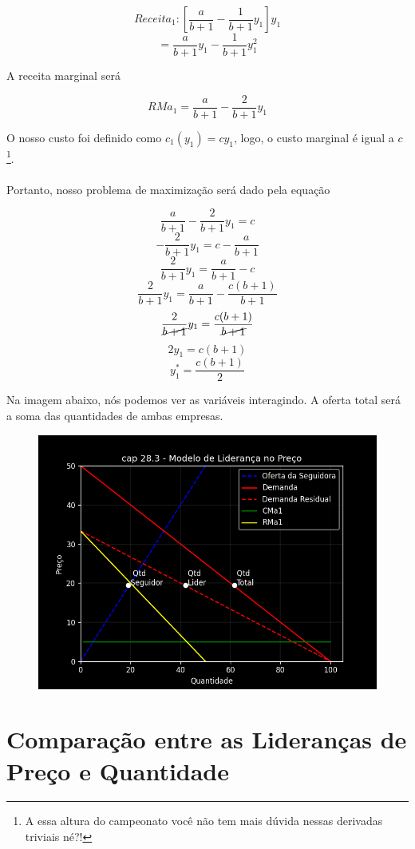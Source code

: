 \documentclass[a4paper,11pt,oneside]{book}
\theoremstyle{definition}
\theoremstyle{break}
\begin{document}
$$ Receita_1: \left[ \frac{a}{b+1} - \frac{1}{b+1}y_1 \right] y_1 $$
$$ = \frac{a}{b+1}y_1 - \frac{1}{b+1}y_1^2 $$

A receita marginal será

$$ RMa_1 = \frac{a}{b+1} - \frac{2}{b+1}y_1 $$

O nosso custo foi definido como $c_1(y_1) = cy_1$, logo, o custo marginal é igual a $c$\footnote{A essa altura do campeonato você não tem mais dúvida nessas derivadas triviais né?!}.
\\~\\
Portanto, nosso problema de maximização será dado pela equação

$$ \frac{a}{b+1} - \frac{2}{b+1}y_1 = c $$
$$ - \frac{2}{b+1}y_1 = c - \frac{a}{b+1} $$
$$ \frac{2}{b+1}y_1 = \frac{a}{b+1} - c $$
$$ \frac{2}{b+1}y_1 = \frac{a}{b+1} - \frac{c(b+1)}{b+1} $$
$$ \frac{2}{\cancel{b+1}}y_1 = \frac{c(b+1)}{\cancel{b+1}} $$
$$ 2y_1 = c(b+1) $$
$$ y_1^* = \frac{c(b+1)}{2} $$

Na imagem abaixo, nós podemos ver as variáveis interagindo. A oferta total será a soma das quantidades de ambas empresas.

\begin{figure}[H]
	\centering
	\includegraphics[scale=0.75]{cap28_3-lideranca_preco.png}
\end{figure}

\section{Comparação entre as Lideranças de Preço e Quantidade}
\end{document}
